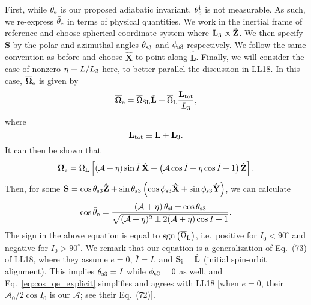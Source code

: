 \documentclass[
        twocolumn,
        twocolappendix
    ]{aastex63}
\renewcommand*{\bm}[1]{\boldsymbol{\mathbf{#1}}}
\newcommand*{\uv}[1]{\hat{\bm{#1}}}
\newcommand*{\p}[1]{\left(#1\right)}
\newcommand*{\s}[1]{\left[#1\right]}
\begin{document}
First, while $\bar{\theta}_{\rm e}$ is our proposed adiabatic invariant,
$\bar{\theta}_{\rm e}^{\rm i}$ is not measurable. As such, we re-express
$\bar{\theta}_{\rm e}$ in terms of physical quantities. We work in the
inertial frame of reference and choose spherical coordinate system where
$\bm{L}_{\rm 3} \propto \uv{Z}$. We then specify $\bm{S}$ by the polar
and azimuthal angles $\theta_{\rm s3}$ and $\phi_{ \rm s3}$ respectively. We
follow the same convention as before and choose $\uv{X}$ to point along
$\uv{L}$. Finally, we will consider the case of nonzero $\eta \equiv L / L_{\rm
3}$ here, to better parallel the discussion in LL18. In this case,
$\bm{\overline{\Omega}}_{\rm e}$ is given by \citep{bin1}
\begin{equation}
    \bm{\overline{\Omega}}_{\rm e} = \overline{\Omega}_{\rm SL} \uv{L}
        + \overline{\Omega}_{\rm L}\frac{\bm{L}_{\rm tot}}{L_3},
\end{equation}
where
\begin{equation}
    \bm{L}_{\rm tot} \equiv \bm{L} + \bm{L}_{\rm 3}.
\end{equation}
It can then be shown that
\begin{equation}
    \bm{\overline{\Omega}}_{\rm e} = \overline{\Omega}_{\rm L}\s{\p{
        \mathcal{A} + \eta}\sin \bar{I}\,\uv{X} + \p{\mathcal{A}\cos \bar{I} +
        \eta\cos \bar{I} + 1} \uv{Z}}.
\end{equation}
Then, for some $\bm{S} = \cos \theta_{\rm s3} \uv{Z} + \sin \theta_{\rm
s3}\p{\cos \phi_{\rm s3}\uv{X} + \sin \phi_{\rm s3}\uv{Y}}$, we can calculate
\begin{equation}
    \cos \bar{\theta}_{\rm e} =
        \frac{\p{\mathcal{A} + \eta}\theta_{\rm sl} \pm \cos \theta_{\rm
        s3}}{ \sqrt{(\mathcal{A} + \eta)^2 \pm 2(\mathcal{A} + \eta)\cos I +
            1}}.\label{eq:cos_qe_explicit}
\end{equation}
The sign in the above equation is equal to
$\mathrm{sgn}\p{\overline{\Omega}_{\rm L}}$, i.e.\ positive for $I_0 < 90^\circ$
and negative for $I_0 > 90^\circ$. We remark that our equation is a
generalization of Eq.~(73) of LL18, where they assume $e = 0$, $\bar{I} = I$,
and $\bm{S}_{\rm i} = \uv{L}$ (initial spin-orbit alignment). This implies
$\theta_{\rm s3} = I$ while $\phi_{\rm s3} = 0$ as well, and
Eq.~\eqref{eq:cos_qe_explicit} simplifies and agrees with LL18 [when $e = 0$,
their $\mathcal{A}_0 / 2 \cos I_0$ is our $\mathcal{A}$; see their Eq.~(72)].
\end{document}
